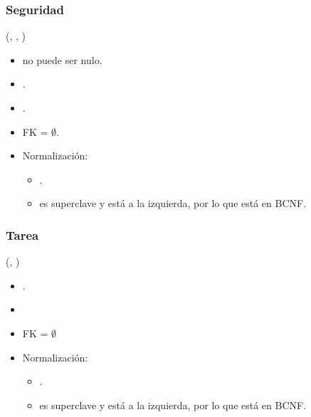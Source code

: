\subsubsection{Seguridad}

    (, , )

    \begin{itemize}
        \item {} no puede ser nulo.
        \item {}.
        \item {}.
        \item FK = $\emptyset$.

        \item Normalización:
            \begin{itemize}
                \item {}.
                \item {} es superclave y está a la izquierda, por lo
                    que está en BCNF.
            \end{itemize}
    \end{itemize}

\subsubsection{Tarea}

    (, )


    \begin{itemize}
        \item {}.
        \item {}
        \item FK = $\emptyset$

        \item Normalización:
            
            \begin{itemize}
                \item {}.
                    
                \item {} es superclave y está a la izquierda, por lo
                    que está en BCNF.
            \end{itemize}
    \end{itemize}


